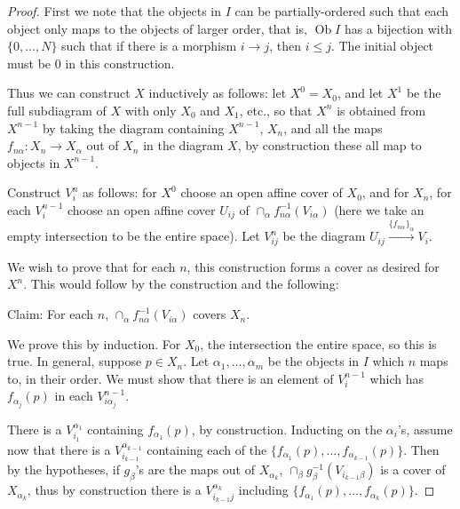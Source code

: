 \documentclass[proquest]{uwthesis}[2014/11/13]
\theoremstyle{definition}
\DeclareMathOperator{\Ob}{Ob}
\begin{document}
\begin{proof}
	First we note that the objects in $I$ can be partially-ordered such that each object only maps to the objects of larger order, that is, $\Ob I$ has a bijection with $\{0, \dots, N\}$ such that if there is a morphism $i \rightarrow j$, then $i \leq j$.
	The initial object must be 0 in this construction.
	
	Thus we can construct $X$ inductively as follows: let $X^0 = X_0$, and let $X^1$ be the full subdiagram of $X$ with only $X_0$ and $X_1$, etc., so that $X^n$ is obtained from $X^{n-1}$ by taking the diagram containing $X^{n-1}$, $X_n$, and all the maps $f_{n\alpha}:X_n \rightarrow X_\alpha$ out of $X_n$ in the diagram $X$, by construction these all map to objects in $X^{n-1}$.
	
	Construct $V_i^n$ as follows: for $X^0$ choose an open affine cover of $X_0$, and for $X_n$, for each $V_i^{n-1}$ choose an open affine cover $U_{ij}$ of $\cap_\alpha f_{n\alpha}^{-1}(V_{i\alpha})$ (here we take an empty intersection to be the entire space).
	Let $V_{ij}^n$ be the diagram $U_{ij} \xrightarrow{\{f_{n\alpha}\}_\alpha} V_i$.
	
	We wish to prove that for each $n$, this construction forms a cover as desired for $X^n$.
	This would follow by the construction and the following:
	
	Claim: For each $n$, $\cap_\alpha f_{n\alpha}^{-1}(V_{i\alpha})$ covers $X_n$.
	
	We prove this by induction.
	For $X_0$, the intersection the entire space, so this is true.
	In general, suppose $p \in X_n$.
	Let $\alpha_1, \dots, \alpha_m$ be the objects in $I$ which $n$ maps to, in their order.
	We must show that there is an element of $V_i^{n-1}$ which has $f_{\alpha_j}(p)$ in each $V_{i \alpha_j}^{n-1}$.
	
	There is a $V_{i_1}^{\alpha_1}$ containing $f_{\alpha_1}(p)$, by construction.
	Inducting on the $\alpha_i$'s, assume now that there is a $V_{i_{k-1}}^{\alpha_{k-1}}$ containing each of the $\{f_{\alpha_1}(p), \dots, f_{\alpha_{k-1}}(p)\}$.
	Then by the hypotheses, if $g_\beta$'s are the maps out of $X_{\alpha_k}$, $\cap_\beta g_{\beta}^{-1}(V_{i_{k-1}\beta})$ is a cover of $X_{\alpha_k}$, thus by construction there is a $V_{i_{k-1}j}^{\alpha_k}$ including $\{f_{\alpha_1}(p), \dots, f_{\alpha_{k}}(p)\}$.
\end{proof}
\end{document}
